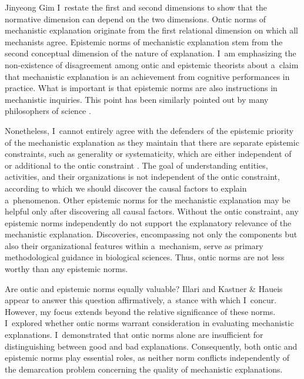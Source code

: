 \begin{artengenv}{Jinyeong Gim}
I~restate the first and second dimensions to show that the normative dimension can depend on the two dimensions. Ontic norms of mechanistic explanation originate from the first relational dimension on which all mechanists agree. Epistemic norms of mechanistic explanation stem from the second conceptual dimension of the nature of explanation. I~am emphasizing the non-existence of disagreement among ontic and epistemic theorists about a~claim that mechanistic explanation is an achievement from cognitive performances in practice. What is important is that epistemic norms are also instructions in mechanistic inquiries. This point has been similarly pointed out by many philosophers of science
\parencites[][]{illari_mechanistic_2013}[][]{van_eck_reconciling_2015}[][]{sheredos_re-reconciling_2016}[][]{kastner_discovering_2021}.%


Nonetheless, I~cannot entirely agree with the defenders of the epistemic priority of the mechanistic explanation as they maintain that there are separate epistemic constraints, such as generality or systematicity, which are either independent of or additional to the ontic constraint
\parencites[][]{van_eck_reconciling_2015}[][]{sheredos_re-reconciling_2016}. %
 The goal of understanding entities, activities, and their organizations is not independent of the ontic constraint, according to which we should discover the causal factors to explain a~phenomenon. Other epistemic norms for the mechanistic explanation may be helpful only after discovering all causal factors. Without the ontic constraint, any epistemic norms independently do not support the explanatory relevance of the mechanistic explanation. Discoveries, encompassing not only the components but also their organizational features within a~mechanism, serve as primary methodological guidance in biological sciences. Thus, ontic norms are not less worthy than any epistemic norms.

Are ontic and epistemic norms equally valuable? Illari
\parencite*[][]{illari_mechanistic_2013} %
 and Kastner \& Haueis 
\parencite*[][]{kastner_discovering_2021} %
 appear to answer this question affirmatively, a~stance with which I~concur. However, my focus extends beyond the relative significance of these norms. I~explored whether ontic norms warrant consideration in evaluating mechanistic explanations. I~demonstrated that ontic norms alone are insufficient for distinguishing between good and bad explanations. Consequently, both ontic and epistemic norms play essential roles, as neither norm conflicts independently of the demarcation problem concerning the quality of mechanistic explanations.


\end{artengenv}
